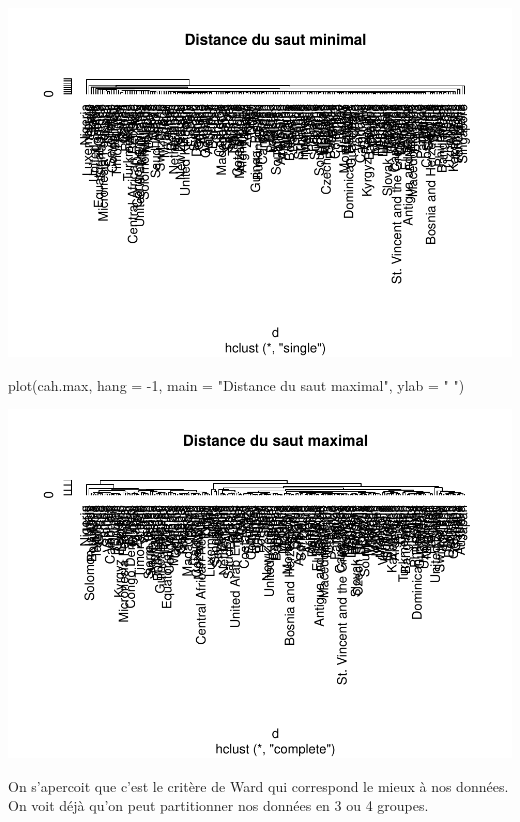 \documentclass[
]{article}
\newenvironment{Shaded}{}{}
\newcommand{\AttributeTok}[1]{#1}
\newcommand{\DecValTok}[1]{#1}
\newcommand{\FunctionTok}[1]{#1}
\newcommand{\NormalTok}[1]{#1}
\newcommand{\SpecialCharTok}[1]{\textcolor[rgb]{0.00,0.50,0.50}{#1}}
\newcommand{\StringTok}[1]{\textcolor[rgb]{0.00,0.50,0.50}{#1}}
\begin{document}
\includegraphics{Projet_files/figure-latex/unnamed-chunk-13-1.pdf}

\begin{Shaded}
\begin{Highlighting}[]
\FunctionTok{plot}\NormalTok{(cah.max, }\AttributeTok{hang =} \SpecialCharTok{{-}}\DecValTok{1}\NormalTok{, }\AttributeTok{main =} \StringTok{"Distance du saut maximal"}\NormalTok{, }\AttributeTok{ylab =} \StringTok{" "}\NormalTok{)}
\end{Highlighting}
\end{Shaded}

\includegraphics{Projet_files/figure-latex/unnamed-chunk-14-1.pdf}

On s'apercoit que c'est le critère de Ward qui correspond le mieux à nos
données. On voit déjà qu'on peut partitionner nos données en 3 ou 4
groupes.
\end{document}
